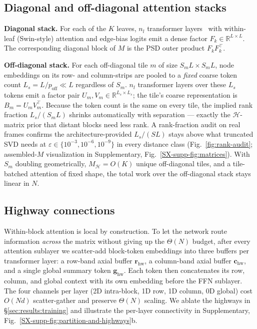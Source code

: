 \documentclass[acmtog,anonymous,review]{acmart}
\theoremstyle{plain}
\begin{document}
\subsection{Diagonal and off-diagonal attention stacks}
\label{sec:method:stacks}
\noindent\textbf{Diagonal stack.} For each of the $K$ leaves, $n_l$ transformer
layers~\cite{Liu2021swin,vaswani2017attention} with within-leaf (Swin-style) attention
and edge-bias logits emit a dense factor $F_k\!\in\!\mathbb{R}^{L\times L}$. The
corresponding diagonal block of $M$ is the PSD outer product $F_kF_k^\top$.

\noindent\textbf{Off-diagonal stack.} For each off-diagonal tile $m$ of size
$S_mL\!\times\!S_mL$, node embeddings on its row- and column-strips are pooled to a
\emph{fixed} coarse token count $L_s\!=\!L/p_{\mathrm{off}}\!\ll\!L$ regardless of $S_m$.
$n_l$ transformer layers over these $L_s$ tokens emit a factor pair
$U_m,V_m\!\in\!\mathbb{R}^{L_s\times L_s}$; the tile's coarse representation is
$B_m\!=\!U_mV_m^\top$. Because the token count is the same on every tile, the implied
rank fraction $L_s/(S_mL)$ shrinks automatically with separation --- exactly the
$\mathcal{H}$-matrix prior that distant blocks need less rank. A rank-fraction audit on
real frames confirms the architecture-provided $L_s/(SL)$ stays above what truncated SVD
needs at $\varepsilon\!\in\!\{10^{-3},10^{-6},10^{-9}\}$ in every distance class
(Fig.~\ref{fig:rank-audit}; assembled-$M$ visualization in Supplementary, Fig.~\ref{SX-supp-fig:matrices}). With $S_m$ doubling
geometrically, $M_{\mathcal{H}}\!=\!O(K)$ unique off-diagonal tiles, and a tile-batched
attention of fixed shape, the total work over the off-diagonal stack stays linear in $N$.

\subsection{Highway connections}
\label{sec:method:highways}
Within-block attention is local by construction. To let the network route information
\emph{across} the matrix without giving up the $\Theta(N)$ budget, after every attention
sublayer we scatter-add block-token embeddings into three buffers per transformer layer:
a row-band axial buffer $\mathbf{r}_{\mathrm{hw}}$, a column-band axial buffer
$\mathbf{c}_{\mathrm{hw}}$, and a single global summary token $\mathbf{g}_{\mathrm{hw}}$.
Each token then concatenates its row, column, and global context with its own embedding
before the FFN sublayer. The four channels per layer (2D intra-block, 1D row, 1D column,
0D global) cost $O(Nd)$ scatter-gather and preserve $\Theta(N)$ scaling. We ablate the
highways in \S\ref{sec:results:training} and illustrate the per-layer connectivity in
Supplementary, Fig.~\ref{SX-supp-fig:partition-and-highways}b.
\end{document}
